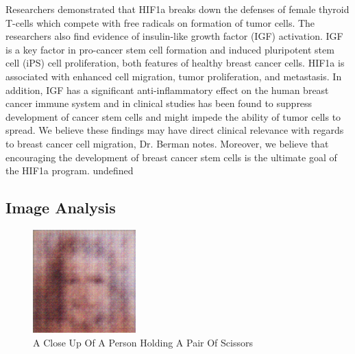 \documentclass{article}%
\begin{document}
Researchers demonstrated that HIF1a breaks down the defenses of female thyroid T{-}cells which compete with free radicals on formation of tumor cells. The researchers also find evidence of insulin{-}like growth factor (IGF) activation. IGF is a key factor in pro{-}cancer stem cell formation and induced pluripotent stem cell (iPS) cell proliferation, both features of healthy breast cancer cells.\newline%
HIF1a is associated with enhanced cell migration, tumor proliferation, and metastasis. In addition, IGF has a significant anti{-}inflammatory effect on the human breast cancer immune system and in clinical studies has been found to suppress development of cancer stem cells and might impede the ability of tumor cells to spread.\newline%
We believe these findings may have direct clinical relevance with regards to breast cancer cell migration, Dr. Berman notes. Moreover, we believe that encouraging the development of breast cancer stem cells is the ultimate goal of the HIF1a program.\newline%
undefined

%
\subsection{Image Analysis}%
\label{subsec:ImageAnalysis}%


\begin{figure}[h!]%
\centering%
\includegraphics[width=150px]{500_fake_images/samples_5_491.png}%
\caption{A Close Up Of A Person Holding A Pair Of Scissors}%
\end{figure}

%
\end{document}
